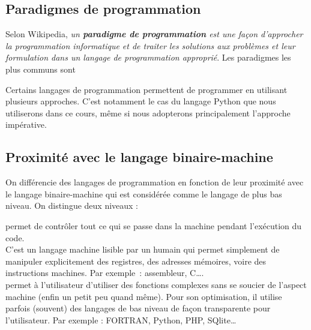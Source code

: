 \subsection{Paradigmes de programmation}
Selon Wikipedia, \textit{un \textbf{paradigme de programmation} est une façon d'approcher la programmation informatique et de traiter les solutions aux problèmes et leur formulation dans un langage de programmation approprié}. Les paradigmes les plus communs sont 
\begin{enumerate}
\end{enumerate}
Certains langages de programmation permettent de programmer en utilisant plusieurs approches. C'est notamment le cas du langage Python que nous utiliserons dans ce cours, même si nous adopterons principalement l'approche impérative.

\subsection{Proximité avec le langage binaire-machine}	
On différencie  des langages de programmation  en fonction de leur proximité avec le langage binaire-machine qui est considérée comme le langage de plus bas niveau. On distingue deux niveaux :
\begin{enumerate}
	  permet de contrôler tout ce qui se passe dans la machine pendant l'exécution du code.\\
	C'est un langage machine lisible par un humain qui permet simplement de  manipuler explicitement des registres, des adresses mémoires, voire des instructions machines.  Par exemple~: assembleur, C\ldots.\\
	
	
	  permet à l'utilisateur d'utiliser des fonctions complexes sans se soucier de l'aspect machine (enfin un petit peu quand même).  Pour son optimisation, il utilise parfois (souvent) des langages de bas niveau de façon transparente pour l'utilisateur.  Par exemple : FORTRAN, Python, PHP, SQlite\ldots
\end{enumerate}

